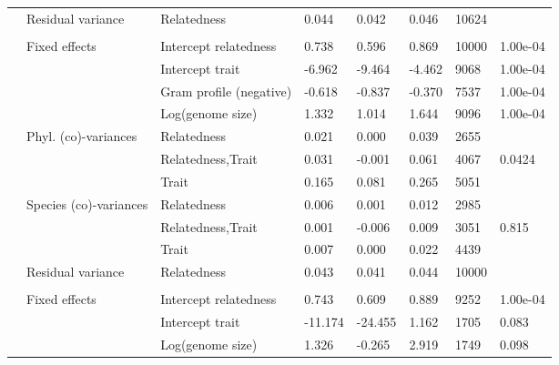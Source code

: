 \begin{longtable}[t]{llllllll}
\hspace{1em} & Residual variance & Relatedness & 0.044 & 0.042 & 0.046 & 10624 & \\
\addlinespace[0.3em]
\multicolumn{8}{l}{\textbf{Secretome}}\\
\hspace{1em} & Fixed effects & Intercept relatedness & 0.738 & 0.596 & 0.869 & 10000 & 1.00e-04\\
\hspace{1em} &  & Intercept trait & -6.962 & -9.464 & -4.462 & 9068 & 1.00e-04\\
\hspace{1em} &  & Gram profile (negative) & -0.618 & -0.837 & -0.370 & 7537 & 1.00e-04\\
\hspace{1em} &  & Log(genome size) & 1.332 & 1.014 & 1.644 & 9096 & 1.00e-04\\
\hspace{1em} & Phyl. (co)-variances & Relatedness & 0.021 & 0.000 & 0.039 & 2655 & \\
\hspace{1em} &  & Relatedness,Trait & 0.031 & -0.001 & 0.061 & 4067 & 0.0424\\
\hspace{1em} &  & Trait & 0.165 & 0.081 & 0.265 & 5051 & \\
\hspace{1em} & Species (co)-variances & Relatedness & 0.006 & 0.001 & 0.012 & 2985 & \\
\hspace{1em} &  & Relatedness,Trait & 0.001 & -0.006 & 0.009 & 3051 & 0.815\\
\hspace{1em} &  & Trait & 0.007 & 0.000 & 0.022 & 4439 & \\
\hspace{1em} & Residual variance & Relatedness & 0.043 & 0.041 & 0.044 & 10000 & \\
\addlinespace[0.3em]
\multicolumn{8}{l}{\textbf{Secretion systems}}\\
\hspace{1em} & Fixed effects & Intercept relatedness & 0.743 & 0.609 & 0.889 & 9252 & 1.00e-04\\
\hspace{1em} &  & Intercept trait & -11.174 & -24.455 & 1.162 & 1705 & 0.083\\
\hspace{1em} &  & Log(genome size) & 1.326 & -0.265 & 2.919 & 1749 & 0.098\\

\end{longtable}
